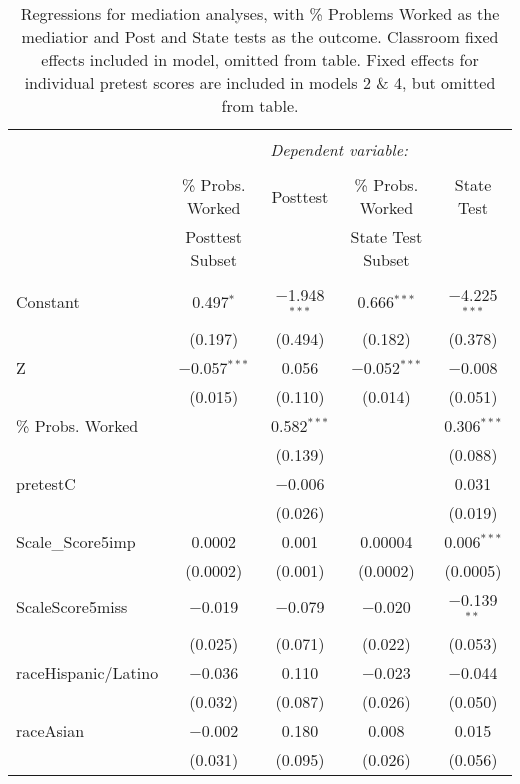 
\begin{table}[!htbp] \centering 
  \caption{Regressions for mediation analyses, with \% Problems Worked as the mediatior and Post and State tests as the outcome. Classroom fixed effects included in model, omitted from table. Fixed effects for individual pretest scores are included in models 2 \& 4, but omitted from table.} 
  \label{} 
\begin{tabular}{@{\extracolsep{5pt}}lcccc} 
\\[-1.8ex]\hline 
\hline \\[-1.8ex] 
 & \multicolumn{4}{c}{\textit{Dependent variable:}} \\ 
\cline{2-5} 
\\[-1.8ex] & \% Probs. Worked & Posttest & \% Probs. Worked & State Test \\ 
 & Posttest Subset &  & State Test Subset &  \\ 
\hline \\[-1.8ex] 
 Constant & 0.497$^{*}$ & $-$1.948$^{***}$ & 0.666$^{***}$ & $-$4.225$^{***}$ \\ 
  & (0.197) & (0.494) & (0.182) & (0.378) \\ 
 Z & $-$0.057$^{***}$ & 0.056 & $-$0.052$^{***}$ & $-$0.008 \\ 
  & (0.015) & (0.110) & (0.014) & (0.051) \\ 
 \% Probs. Worked &  & 0.582$^{***}$ &  & 0.306$^{***}$ \\ 
  &  & (0.139) &  & (0.088) \\ 
 pretestC &  & $-$0.006 &  & 0.031 \\ 
  &  & (0.026) &  & (0.019) \\ 
 Scale\_Score5imp & 0.0002 & 0.001 & 0.00004 & 0.006$^{***}$ \\ 
  & (0.0002) & (0.001) & (0.0002) & (0.0005) \\ 
 ScaleScore5miss & $-$0.019 & $-$0.079 & $-$0.020 & $-$0.139$^{**}$ \\ 
  & (0.025) & (0.071) & (0.022) & (0.053) \\ 
 raceHispanic/Latino & $-$0.036 & 0.110 & $-$0.023 & $-$0.044 \\ 
  & (0.032) & (0.087) & (0.026) & (0.050) \\ 
 raceAsian & $-$0.002 & 0.180 & 0.008 & 0.015 \\ 
  & (0.031) & (0.095) & (0.026) & (0.056) \\ 

\end{tabular}
\end{table}
